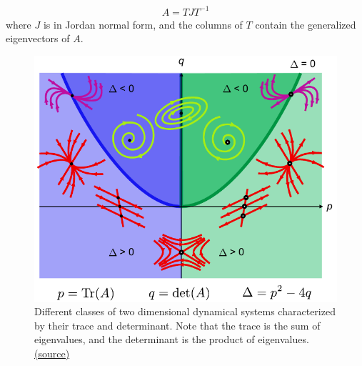 \documentclass[a4paper,11pt]{exam}
\newcounter{ct}
\begin{document}
\begin{questions}
\begin{tcolorbox}[colback=black!1!,title=Jordan normal form]
    \begin{align}
        A = T J T^{-1}
    \end{align}
    where $J$ is in Jordan normal form, and the columns of $T$ contain the generalized eigenvectors of $A$.
\end{tcolorbox}
\begin{figure}[t]
    \centering
    \includegraphics{figs/phase_plane_nodes.pdf}
    \caption{Different classes of two dimensional dynamical systems characterized by their trace and determinant.
	Note that the trace is the sum of eigenvalues, and the determinant is the product of eigenvalues.
	\href{https://commons.wikimedia.org/wiki/File:Phase_plane_nodes.svg}{(source)}
    }
\end{figure}

\end{questions}
\end{document}
